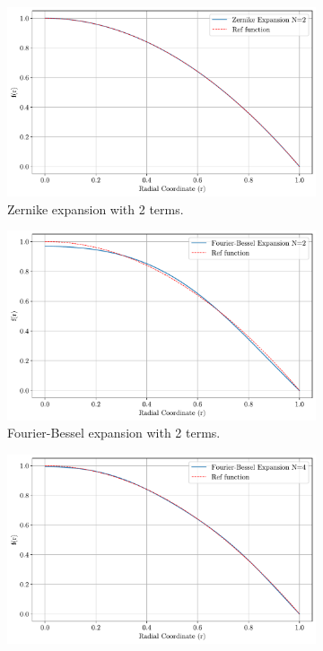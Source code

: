 \begin{figure}
    \centering
    \begin{subfigure}[b]{0.48\textwidth}
        \centering
        \includegraphics[width=\textwidth]{figs/zernike_2.pdf}
        \caption{Zernike expansion with 2 terms.}
    \end{subfigure}
    \hspace{1em}
    \begin{subfigure}[b]{0.48\textwidth}
        \centering
        \includegraphics[width=\textwidth]{figs/bessel_exp_2.pdf}
        \caption{Fourier-Bessel expansion with 2 terms.}
    \end{subfigure}
    \hspace{1em}
    \begin{subfigure}[b]{0.48\textwidth}
        \centering
        \includegraphics[width=\textwidth]{figs/bessel_exp_4.pdf}

\end{subfigure}
\end{figure}
